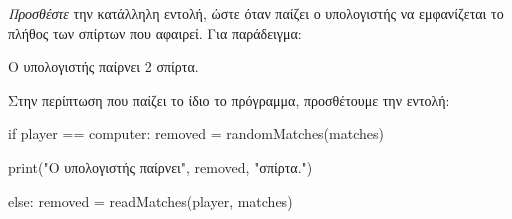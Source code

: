 \documentclass[a4paper,11pt,oneside]{book}
\begin{document}
\begin{step}
\emph{Προσθέστε} την κατάλληλη εντολή, ώστε όταν παίζει ο υπολογιστής να εμφανίζεται το πλήθος των σπίρτων που αφαιρεί. Για παράδειγμα:

\marginnote[14pt]{\iconcomputer}
\begin{pyterm}
Ο υπολογιστής παίρνει 2 σπίρτα.
\end{pyterm}

\begin{answer}
Στην περίπτωση που παίζει το ίδιο το πρόγραμμα, προσθέτουμε την εντολή:

\begin{pyplain}
    if player == computer:
        removed = randomMatches(matches)
\end{pyplain}
\begin{pynew}
        print("Ο υπολογιστής παίρνει", removed, "σπίρτα.")
\end{pynew}
\begin{pyplain}
    else:
        removed = readMatches(player, matches)    
\end{pyplain}
\end{answer}
\end{step}
\end{document}
